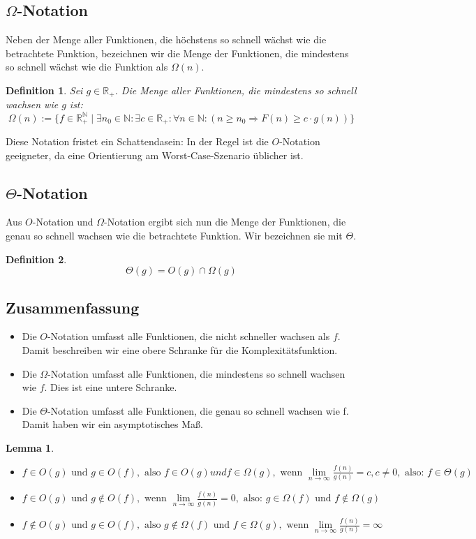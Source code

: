 \documentclass[11pt,a4paper]{scrartcl}
\newtheorem{definition}{Definition}
\newtheorem{lemma}{Lemma}
\begin{document}
\subsection{$\Omega$-Notation}
Neben der Menge aller Funktionen, die höchstens so schnell wächst wie die betrachtete Funktion, bezeichnen wir die Menge der Funktionen, die mindestens so schnell wächst wie die Funktion als $\Omega(n)$.
\begin{definition} Sei $g \in \mathbb{R_{+}}$. Die Menge aller Funktionen, die mindestens so schnell wachsen wie $g$ ist: 
\[\Omega(n) := \{ f \in \mathbb{R_{+}^{\mathbb{N}}} \mid \exists n_{0} \in \mathbb{N}: \exists c \in \mathbb{R_{+}}: \forall n \in \mathbb{N}: (n \geq n_{0} \Rightarrow F(n) \geq c \cdot g(n))\}\]
\end{definition}
Diese Notation fristet ein Schattendasein: In der Regel ist die $O$-Notation geeigneter, da eine Orientierung am {\glqq}Worst-Case-Szenario{\grqq} üblicher ist.
\subsection{$\Theta$-Notation}
Aus $O$-Notation und $\Omega$-Notation ergibt sich nun die Menge der Funktionen, die genau so schnell wachsen wie die betrachtete Funktion. Wir bezeichnen sie mit $\Theta$.
\begin{definition}
\[\Theta(g) = O(g) \cap \Omega(g)\]
\end{definition}
\subsection{Zusammenfassung}
\begin{itemize}
\item Die $O$-Notation umfasst alle Funktionen, die nicht schneller wachsen als $f$. Damit beschreiben wir eine obere Schranke für die Komplexitätsfunktion.
\item Die $\Omega$-Notation umfasst alle Funktionen, die mindestens so schnell wachsen wie $f$. Dies ist eine untere Schranke.
\item Die $\Theta$-Notation umfasst alle Funktionen, die genau so schnell wachsen wie f. Damit haben wir ein asymptotisches Maß.  
\end{itemize}
\begin{lemma}
\begin{itemize}
\item $f \in O(g) \text{ und } g \in O(f), \text{ also } f \in O(g) und f \in \Omega (g), \text{ wenn } \lim \limits_{n \to \infty} \frac{f(n)}{g(n)} = c, c \neq 0, \text{ also: } f \in \Theta (g)$
\item $f \in O(g) \text{ und } g \notin O(f), \text{ wenn } \lim \limits_{n \to \infty} \frac{f(n)}{g(n)} = 0, \text{ also: } g \in \Omega (f) \text{ und } f \notin \Omega (g)$
\item $ f \notin O(g) \text{ und } g \in O(f), \text{ also } g \notin \Omega (f) \text{ und } f \in \Omega (g), \text{ wenn } \lim \limits_{n \to \infty} \frac{f(n)}{g(n)} = \infty$
\end{itemize}
\end{lemma}
\end{document}
